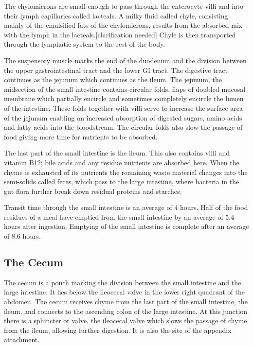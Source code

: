 The chylomicrons are small enough to pass through the enterocyte villi and into their lymph capillaries called lacteals. A milky fluid called chyle, consisting mainly of the emulsified fats of the chylomicrons, results from the absorbed mix with the lymph in the lacteals.{[}clarification needed{]} Chyle is then transported through the lymphatic system to the rest of the body.

The suspensory muscle marks the end of the duodenum and the division between the upper gastrointestinal tract and the lower GI tract. The digestive tract continues as the jejunum which continues as the ileum. The jejunum, the midsection of the small intestine contains circular folds, flaps of doubled mucosal membrane which partially encircle and sometimes completely encircle the lumen of the intestine. These folds together with villi serve to increase the surface area of the jejunum enabling an increased absorption of digested sugars, amino acids and fatty acids into the bloodstream. The circular folds also slow the passage of food giving more time for nutrients to be absorbed.

The last part of the small intestine is the ileum. This also contains villi and vitamin B12; bile acids and any residue nutrients are absorbed here. When the chyme is exhausted of its nutrients the remaining waste material changes into the semi-solids called feces, which pass to the large intestine, where bacteria in the gut flora further break down residual proteins and starches.

Transit time through the small intestine is an average of 4 hours. Half of the food residues of a meal have emptied from the small intestine by an average of 5.4 hours after ingestion. Emptying of the small intestine is complete after an average of 8.6 hours.

\hypertarget{the-cecum}{%
\subsection{The Cecum}\label{the-cecum}}

The cecum is a pouch marking the division between the small intestine and the large intestine. It lies below the ileocecal valve in the lower right quadrant of the abdomen. The cecum receives chyme from the last part of the small intestine, the ileum, and connects to the ascending colon of the large intestine. At this junction there is a sphincter or valve, the ileocecal valve which slows the passage of chyme from the ileum, allowing further digestion. It is also the site of the appendix attachment.

